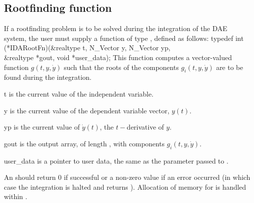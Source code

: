 {\subsection{Rootfinding function}
\label{ss:rootFn}
If a rootfinding problem is to be solved during the integration of the DAE system,
the user must supply a {\CC} function of type , defined as follows:
{
  typedef int (*IDARootFn)(&realtype t, N\_Vector y, N\_Vector yp, \\
                           &realtype *gout, void *user\_data);
}
{
  This function computes a vector-valued function $g(t,y,\dot{y})$ such that the
  roots of the  components $g_i(t,y,\dot{y})$ are to be found during
  the integration.
}
{
  \begin{args}
  \item[t]
    is the current value of the independent variable.
  \item[y]
    is the current value of the dependent variable vector, $y(t)$.
  \item[yp]
    is the current value of $\dot{y}(t)$, the $t-$derivative of $y$.
  \item[gout]
    is the output array, of length , with components $g_i(t,y,\dot{y})$.
  \item[user\_data]
    is a pointer to user data, the same as the 
    parameter passed to .
  \end{args}
}
{
  An  should return 0 if successful or a non-zero value if
  an error occurred (in which case the integration is halted and  returns
  ).
}
{
  Allocation of memory for  is handled within {\idas}.
}

}
